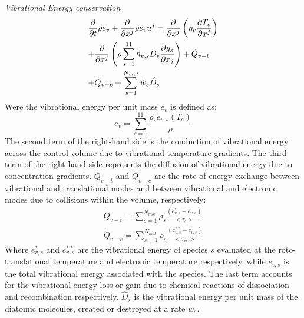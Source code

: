 \documentclass[11pt,a4paper,twocolumn]{article}
\begin{document}
\textit{Vibrational Energy conservation}
\begin{multline}\label{eq:vibrational}
     \frac{\partial}{\partial t}\rho e_v+\frac{\partial}{\partial x^j}\rho e_v u^j = \frac{\partial}{\partial x^j}\left( \eta_v \frac{\partial T_v}{\partial x^j}\right)\\+\frac{\partial}{\partial x^j}\left(\rho\sum_{s=1}^{11} h_{e,s}D_s\frac{\partial y_s}{\partial x_j} \right)+ \dot Q_{v-t} \hfill\\+ \dot Q_{v-e} +\sum_{s=1}^{N_{mol}}\dot w_s \hat{D_s}\hfill
\end{multline}
Were the vibrational energy per unit mass $e_v$ is defined as:
\begin{equation*}
    e_v = \sum_{s=1}^{11}\frac{\rho_s e_{v,s}(T_e)}{\rho}
\end{equation*}
The second term of the right-hand side is the conduction of vibrational energy across the control volume due to vibrational temperature gradients. The third term of the right-hand side represents the diffusion of vibrational energy due to concentration gradients. $\dot Q_{v-t}$ and $\dot Q_{v-e}$ are the rate of energy exchange between vibrational and translational modes and between vibrational and electronic modes due to collisions within the volume, respectively:
\begin{align*}
     \dot Q_{v-t}=\sum_{s=1}^{N_{mol}}\rho_s\frac{(e_{v,s}^*-e_{v,s})}{<\tau_s>}\\
     \dot Q_{v-e}=\sum_{s=1}^{N_{mol}}\rho_s\frac{(e_{v,s}^{**}-e_{v,s})}{<\tau_{es}>} 
\end{align*}
Where $e_{v,s}^*$ and $e_{v,s}^{**}$ are the vibrational energy of species $s$ evaluated at the roto-translational temperature and electronic temperature respectively, while $e_{v,s}$ is the total vibrational energy associated with the species. 
The last term accounts for the vibrational energy loss or gain due to chemical reactions of dissociation and recombination respectively. $\hat{D}_s$ is the vibrational energy per unit mass of the diatomic molecules, created or destroyed at a rate $\dot w_s$.\\
\end{document}
